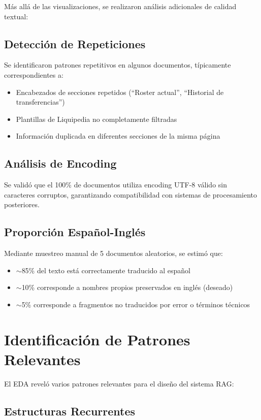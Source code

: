 Más allá de las visualizaciones, se realizaron análisis adicionales de calidad textual:

\subsection{Detección de Repeticiones}

Se identificaron patrones repetitivos en algunos documentos, típicamente correspondientes a:
\begin{itemize}
    \item Encabezados de secciones repetidos (``Roster actual'', ``Historial de transferencias'')
    \item Plantillas de Liquipedia no completamente filtradas
    \item Información duplicada en diferentes secciones de la misma página
\end{itemize}

\subsection{Análisis de Encoding}

Se validó que el 100\% de documentos utiliza encoding UTF-8 válido sin caracteres corruptos, garantizando compatibilidad con sistemas de procesamiento posteriores.

\subsection{Proporción Español-Inglés}

Mediante muestreo manual de 5 documentos aleatorios, se estimó que:
\begin{itemize}
    \item $\sim$85\% del texto está correctamente traducido al español
    \item $\sim$10\% corresponde a nombres propios preservados en inglés (deseado)
    \item $\sim$5\% corresponde a fragmentos no traducidos por error o términos técnicos
\end{itemize}

\section{Identificación de Patrones Relevantes}

El EDA reveló varios patrones relevantes para el diseño del sistema RAG:

\subsection{Estructuras Recurrentes}

